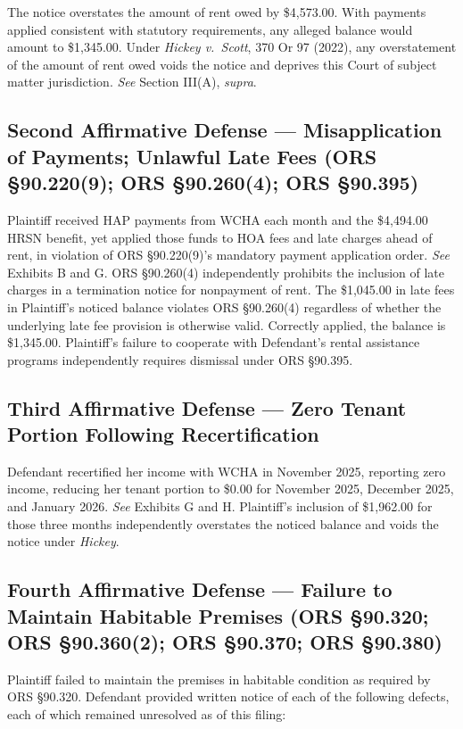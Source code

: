 \documentclass[12pt,letterpaper]{article}
\begin{document}
The notice overstates the amount of rent owed by \$4,573.00. With payments applied consistent with statutory requirements, any alleged balance would amount to \$1,345.00. Under \textit{Hickey v.\ Scott}, 370 Or 97 (2022), any overstatement of the amount of rent owed voids the notice and deprives this Court of subject matter jurisdiction. \textit{See} Section III(A), \textit{supra}.

\subsection{Second Affirmative Defense --- Misapplication of Payments; Unlawful Late Fees (ORS \S90.220(9); ORS \S90.260(4); ORS \S90.395)}

Plaintiff received HAP payments from WCHA each month and the \$4,494.00 HRSN benefit, yet applied those funds to HOA fees and late charges ahead of rent, in violation of ORS \S90.220(9)'s mandatory payment application order. \textit{See} Exhibits B and G. ORS \S90.260(4) independently prohibits the inclusion of late charges in a termination notice for nonpayment of rent. The \$1,045.00 in late fees in Plaintiff's noticed balance violates ORS \S90.260(4) regardless of whether the underlying late fee provision is otherwise valid. Correctly applied, the balance is \$1,345.00. Plaintiff's failure to cooperate with Defendant's rental assistance programs independently requires dismissal under ORS \S90.395.

\subsection{Third Affirmative Defense --- Zero Tenant Portion Following Recertification}

Defendant recertified her income with WCHA in November 2025, reporting zero income, reducing her tenant portion to \$0.00 for November 2025, December 2025, and January 2026. \textit{See} Exhibits G and H. Plaintiff's inclusion of \$1,962.00 for those three months independently overstates the noticed balance and voids the notice under \textit{Hickey}.

\subsection{Fourth Affirmative Defense --- Failure to Maintain Habitable Premises (ORS \S90.320; ORS \S90.360(2); ORS \S90.370; ORS \S90.380)}

Plaintiff failed to maintain the premises in habitable condition as required by ORS \S90.320. Defendant provided written notice of each of the following defects, each of which remained unresolved as of this filing:
\end{document}

